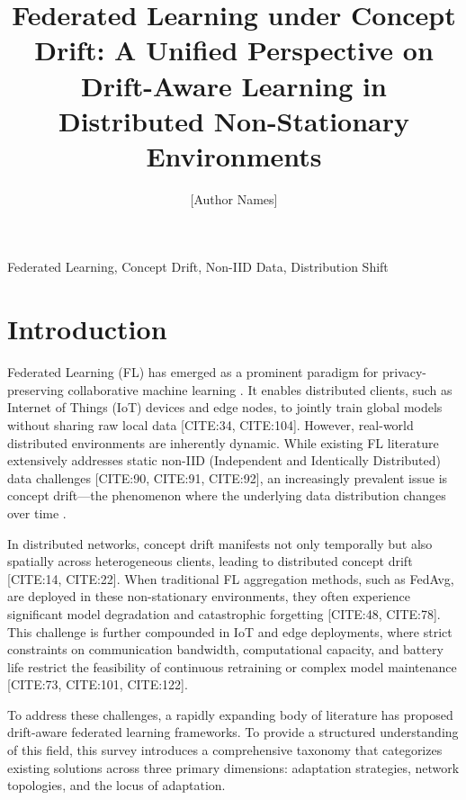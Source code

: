 \documentclass[journal]{IEEEtran}
\title{Federated Learning under Concept Drift: A Unified Perspective on Drift-Aware Learning in Distributed Non-Stationary Environments}
\author{[Author Names]}
\begin{document}
\maketitle

\begin{abstract}
\end{abstract}

\begin{IEEEkeywords}Federated Learning, Concept Drift, Non-IID Data, Distribution Shift\end{IEEEkeywords}

\section{Introduction}
\label{sec:introduction}

Federated Learning (FL) has emerged as a prominent paradigm for privacy-preserving collaborative machine learning \cite{Collins2025}. It enables distributed clients, such as Internet of Things (IoT) devices and edge nodes, to jointly train global models without sharing raw local data [CITE:34, CITE:104]. However, real-world distributed environments are inherently dynamic. While existing FL literature extensively addresses static non-IID (Independent and Identically Distributed) data challenges [CITE:90, CITE:91, CITE:92], an increasingly prevalent issue is concept drift—the phenomenon where the underlying data distribution changes over time \cite{Martin2025}. 

In distributed networks, concept drift manifests not only temporally but also spatially across heterogeneous clients, leading to distributed concept drift [CITE:14, CITE:22]. When traditional FL aggregation methods, such as FedAvg, are deployed in these non-stationary environments, they often experience significant model degradation and catastrophic forgetting [CITE:48, CITE:78]. This challenge is further compounded in IoT and edge deployments, where strict constraints on communication bandwidth, computational capacity, and battery life restrict the feasibility of continuous retraining or complex model maintenance [CITE:73, CITE:101, CITE:122].

To address these challenges, a rapidly expanding body of literature has proposed drift-aware federated learning frameworks. To provide a structured understanding of this field, this survey introduces a comprehensive taxonomy that categorizes existing solutions across three primary dimensions: adaptation strategies, network topologies, and the locus of adaptation. 
\end{document}
